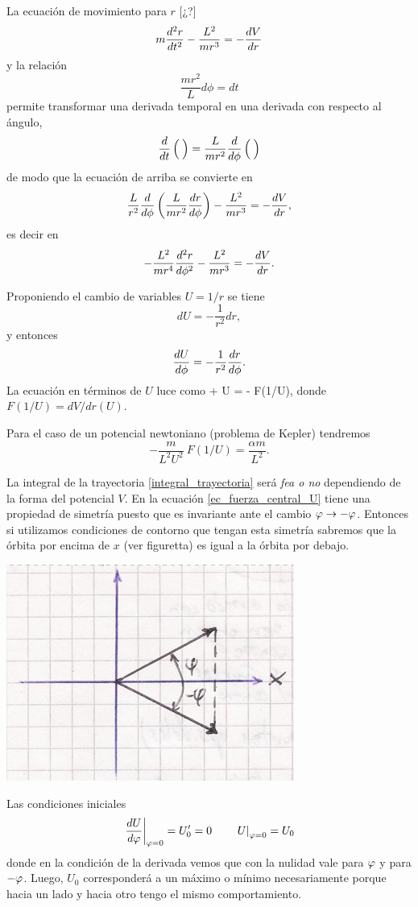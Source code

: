 \documentclass[10pt,oneside]{CBFT_book}
\begin{document}
La ecuación de movimiento para $r$ [¿?]
\[
	m \dtot[2]{r}{t} - \frac{L^2}{mr^3} = -\dtot{V}{r}
\]
y la relación 
\[
	\frac{mr^2}{L} d\phi = dt
\]
permite transformar una derivada temporal en una derivada con respecto al ángulo,
\[
	\dtot{}{t}\left( \phantom{\frac{}{}} \right) = \frac{L}{mr^2} \dtot{}{\phi}\left( \phantom{\frac{}{}} \right)
\]
de modo que la ecuación de arriba se convierte en
\[
	\frac{L}{r^2}\dtot{}{\phi}\left( \frac{L}{mr^2} \dtot{r}{\phi} \right) - \frac{L^2}{mr^3} = -\dtot{V}{r},
\]
es decir en
\[
	-\frac{L^2}{mr^4}\dtot[2]{r}{\phi} - \frac{L^2}{mr^3} = -\dtot{V}{r}.
\]

Proponiendo el cambio de variables $U = 1/r$ se tiene 
\[
	dU = -\frac{1}{r^2} dr,
\]
y entonces
\[
	\dtot{U}{\phi} = -\frac{1}{r^2} \dtot{r}{\phi}.
\]
La ecuación en términos de $U$ luce como
\be
	 + U = - \: F(1/U),
	\label{ec_fuerza_central_U}
\ee
donde $F(1/U) = dV / dr(U)$.

Para el caso de un potencial newtoniano (problema de Kepler) tendremos 
\[
	-\frac{m}{L^2U^2} \: F(1/U) = \frac{\alpha m}{L^2}.
\]

La integral de la trayectoria \eqref{integral_trayectoria} será {\it fea o no} dependiendo de la forma del potencial $V$.
En la ecuación \eqref{ec_fuerza_central_U} tiene una propiedad de simetría puesto que es invariante ante el cambio 
$\vp \to -\vp$. Entonces si utilizamos condiciones de contorno que tengan esta simetría sabremos que la órbita por
encima de $x$ (ver figuretta) es igual a la órbita por debajo.

\includegraphics[scale=0.3]{images/fig_mc_orbitas_simetria.jpg}

Las condiciones iniciales 
\[
	\left.\dtot{U}{\vp}\right|_{\vp=0} = U_0' = 0 \qquad \left. U \right|_{\vp=0} = U_0
\]
donde en la condición de la derivada vemos que con la nulidad vale para $\vp$ y para $-\vp$.
Luego, $U_0$ corresponderá a un máximo o mínimo necesariamente porque hacia un lado y hacia otro tengo el mismo
comportamiento.
\end{document}
